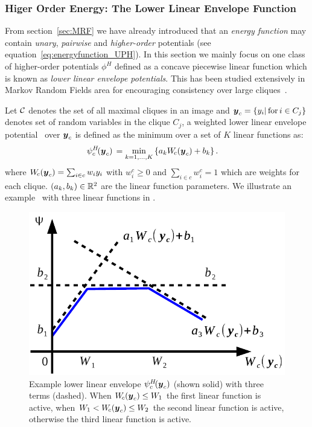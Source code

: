 \documentclass[sigconf, anonymous, review]{acmart}
\renewcommand{\cite}{\citep}
\begin{document}
\subsubsection{Higer Order Energy: The Lower Linear Envelope Function}
\label{sec:llep}

From section~\ref{sec:MRF} we have already introduced that an
\emph{energy function} may contain \emph{unary}, \emph{pairwise}
and \emph{higher-order} potentials (see
equation~\eqref{eq:energyfunction_UPH}). In this section we
mainly focus on one class of higher-order potentials $\phi^H$
defined as a concave piecewise linear function which is known as
\emph{lower linear envelope potentials}. This has been studied
extensively in Markov Random Fields area for encouraging
consistency over large
cliques~\cite{Kohli:CVPR07,Nowozin:2011,Gould:ICML2011}.

Let ${\cal C}$ denotes the set of all maximal cliques in an image and
${\boldsymbol{y}}_c=\{y_i |\text{\,for\,} i \in C_j\}$ denotes set of random
variables in the clique $C_j$, a weighted lower linear envelope
potential~\cite{gouldlearning} over ${\boldsymbol{y}}_c$ is defined as the
minimum over a set of $K$ linear functions as:
%
\begin{align}
  \psi^H_c\!({\boldsymbol{y}}_c) \, &= \min_{k=1, \ldots, K} \left\{ a_k W_{\!c}({\boldsymbol{y}}_c) + b_k \right\}.
  \label{eqn:potential2}
\end{align}
%
where $W_{\!c}({\boldsymbol{y}}_c) = \sum_{i \in c} w_i y_i$ with $w^c_i \geq
0$ and $\sum_{i \in c} w^c_i = 1$ which are weights for each
clique. $(a_k, b_k) \in \mathbb{R}^2$ are the linear function
parameters. We illustrate an example~\cite{gouldlearning} with
three linear functions in .
\begin{figure}[ht]
  \centering
  \includegraphics[width=0.6\columnwidth]{Methodology/figures/not_redundant}
  \caption{\label{fig:nonredundant} Example lower linear envelope
    $\psi^H_c\!({\boldsymbol{y}}_c)$ (shown solid) with three terms (dashed).
    When $W_{\!c}({\boldsymbol{y}}_c) \leq W_1$ the first linear function is
    active, when $W_1 < W_{\!c}({\boldsymbol{y}}_c) \leq W_2$ the second
    linear function is active, otherwise the third linear
    function is active.}
\end{figure}
\end{document}
